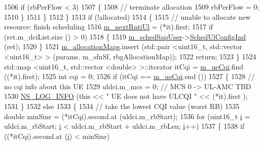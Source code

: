 \begin{DoxyCode}
1506               \textcolor{keywordflow}{if} (rbPerFlow < 3)
1507                 \{
1508                   \textcolor{comment}{// terminate allocation}
1509                   rbPerFlow = 0;                 
1510                 \}
1511             \}
1512         \}
1513       \textcolor{keywordflow}{if} (!allocated)
1514         \{
1515           \textcolor{comment}{// unable to allocate new resource: finish scheduling}
1516           \hyperlink{classns3_1_1RrFfMacScheduler_afd1cdb17c29e2a04980e4bea7d537e0f}{m\_nextRntiUl} = (*it).first;
1517           \textcolor{keywordflow}{if} (ret.m\_dciList.size () > 0)
1518             \{
1519               \hyperlink{classns3_1_1RrFfMacScheduler_a1d834e008836f5b748b81d8d3dc5f926}{m\_schedSapUser}->\hyperlink{classns3_1_1FfMacSchedSapUser_a1b89636256701a84d990db7db8aea874}{SchedUlConfigInd} (ret);
1520             \}
1521           \hyperlink{classns3_1_1RrFfMacScheduler_a9554a5b41b05461bdbcd12dcdecb34ea}{m\_allocationMaps}.insert (std::pair <uint16\_t, std::vector <uint16\_t> > (params.
      m\_sfnSf, rbgAllocationMap));
1522           \textcolor{keywordflow}{return};
1523         \}
1524       std::map <uint16\_t, std::vector <double> >::iterator itCqi = \hyperlink{classns3_1_1RrFfMacScheduler_aa19c6b6aafe91b47dbd96017fc913b40}{m\_ueCqi}.find ((*it).first);
1525       \textcolor{keywordtype}{int} cqi = 0;
1526       \textcolor{keywordflow}{if} (itCqi == \hyperlink{classns3_1_1RrFfMacScheduler_aa19c6b6aafe91b47dbd96017fc913b40}{m\_ueCqi}.end ())
1527         \{
1528           \textcolor{comment}{// no cqi info about this UE}
1529           uldci.m\_mcs = 0; \textcolor{comment}{// MCS 0 -> UL-AMC TBD}
1530           \hyperlink{group__logging_gafbd73ee2cf9f26b319f49086d8e860fb}{NS\_LOG\_INFO} (\textcolor{keyword}{this} << \textcolor{stringliteral}{" UE does not have ULCQI "} << (*it).first );
1531         \}
1532       \textcolor{keywordflow}{else}
1533         \{
1534           \textcolor{comment}{// take the lowest CQI value (worst RB)}
1535           \textcolor{keywordtype}{double} minSinr = (*itCqi).second.at (uldci.m\_rbStart);
1536           \textcolor{keywordflow}{for} (uint16\_t \hyperlink{bernuolliDistribution_8m_a6f6ccfcf58b31cb6412107d9d5281426}{i} = uldci.m\_rbStart; \hyperlink{bernuolliDistribution_8m_a6f6ccfcf58b31cb6412107d9d5281426}{i} < uldci.m\_rbStart + uldci.m\_rbLen; 
      \hyperlink{bernuolliDistribution_8m_a6f6ccfcf58b31cb6412107d9d5281426}{i}++)
1537             \{
1538               \textcolor{keywordflow}{if} ((*itCqi).second.at (\hyperlink{bernuolliDistribution_8m_a6f6ccfcf58b31cb6412107d9d5281426}{i}) < minSinr)

\end{DoxyCode}
